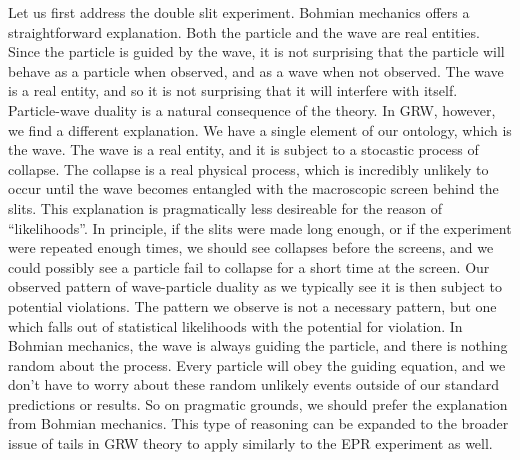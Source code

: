\documentclass[11pt, a4paper]{article}
\begin{document}
Let us first address the double slit experiment. Bohmian mechanics offers a 
straightforward explanation. Both the particle and the wave are real entities.
Since the particle is guided by the wave, it is not surprising that the particle
will behave as a particle when observed, and as a wave when not observed. The
wave is a real entity, and so it is not surprising that it will interfere with
itself. Particle-wave duality is a natural consequence of the theory. In GRW, 
however, we find a different explanation. We have a single element of our
ontology, which is the wave. The wave is a real entity, and it is subject to
a stocastic process of collapse. The collapse is a real physical process, which
is incredibly unlikely to occur until the wave becomes entangled with the
macroscopic screen behind the slits. This explanation is pragmatically less
desireable for the reason of ``likelihoods''. In principle, if the slits were
made long enough, or if the experiment were repeated enough times, we should see
collapses before the screens, and we could possibly see a particle fail to
collapse for a short time at the screen. Our observed pattern of wave-particle 
duality as we typically see it is then subject to potential violations. The
pattern we observe is not a necessary pattern, but one which falls out of 
statistical likelihoods with the potential for violation. In Bohmian mechanics,
the wave is always guiding the particle, and there is nothing random about the
process. Every particle will obey the guiding equation, and we don't have to
worry about these random unlikely events outside of our standard predictions or
results. So on pragmatic grounds, we should prefer the explanation from Bohmian
mechanics. This type of reasoning can be expanded to the broader issue of tails
in GRW theory to apply similarly to the EPR experiment as well.
\end{document}
